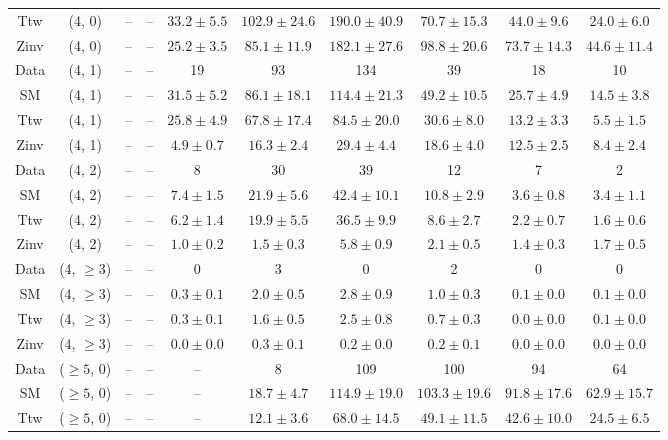 \begin{table}[h!]
{\begin{tabular}{cccccccccc}
	Ttw & (4, 0) & -- & -- & $33.2\pm 5.5$ & $102.9\pm 24.6$ & $190.0\pm 40.9$ & $70.7\pm 15.3$ & $44.0\pm 9.6$ & $24.0\pm 6.0$ \\[0.5ex] 
	Zinv & (4, 0) & -- & -- & $25.2\pm 3.5$ & $85.1\pm 11.9$ & $182.1\pm 27.6$ & $98.8\pm 20.6$ & $73.7\pm 14.3$ & $44.6\pm 11.4$ \\[0.5ex] 
	Data & (4, 1) & -- & -- & 19 & 93 & 134 & 39 & 18 & 10 \\[0.5ex] 
	SM & (4, 1) & -- & -- & $31.5\pm 5.2$ & $86.1\pm 18.1$ & $114.4\pm 21.3$ & $49.2\pm 10.5$ & $25.7\pm 4.9$ & $14.5\pm 3.8$ \\[0.5ex] 
	Ttw & (4, 1) & -- & -- & $25.8\pm 4.9$ & $67.8\pm 17.4$ & $84.5\pm 20.0$ & $30.6\pm 8.0$ & $13.2\pm 3.3$ & $5.5\pm 1.5$ \\[0.5ex] 
	Zinv & (4, 1) & -- & -- & $4.9\pm 0.7$ & $16.3\pm 2.4$ & $29.4\pm 4.4$ & $18.6\pm 4.0$ & $12.5\pm 2.5$ & $8.4\pm 2.4$ \\[0.5ex] 
	Data & (4, 2) & -- & -- & 8 & 30 & 39 & 12 & 7 & 2 \\[0.5ex] 
	SM & (4, 2) & -- & -- & $7.4\pm 1.5$ & $21.9\pm 5.6$ & $42.4\pm 10.1$ & $10.8\pm 2.9$ & $3.6\pm 0.8$ & $3.4\pm 1.1$ \\[0.5ex] 
	Ttw & (4, 2) & -- & -- & $6.2\pm 1.4$ & $19.9\pm 5.5$ & $36.5\pm 9.9$ & $8.6\pm 2.7$ & $2.2\pm 0.7$ & $1.6\pm 0.6$ \\[0.5ex] 
	Zinv & (4, 2) & -- & -- & $1.0\pm 0.2$ & $1.5\pm 0.3$ & $5.8\pm 0.9$ & $2.1\pm 0.5$ & $1.4\pm 0.3$ & $1.7\pm 0.5$ \\[0.5ex] 
	Data & (4, $\ge3$) & -- & -- & 0 & 3 & 0 & 2 & 0 & 0 \\[0.5ex] 
	SM & (4, $\ge3$) & -- & -- & $0.3\pm 0.1$ & $2.0\pm 0.5$ & $2.8\pm 0.9$ & $1.0\pm 0.3$ & $0.1\pm 0.0$ & $0.1\pm 0.0$ \\[0.5ex] 
	Ttw & (4, $\ge3$) & -- & -- & $0.3\pm 0.1$ & $1.6\pm 0.5$ & $2.5\pm 0.8$ & $0.7\pm 0.3$ & $0.0\pm 0.0$ & $0.1\pm 0.0$ \\[0.5ex] 
	Zinv & (4, $\ge3$) & -- & -- & $0.0\pm 0.0$ & $0.3\pm 0.1$ & $0.2\pm 0.0$ & $0.2\pm 0.1$ & $0.0\pm 0.0$ & $0.0\pm 0.0$ \\[0.5ex] 
	Data & ($\ge5$, 0) & -- & -- & -- & 8 & 109 & 100 & 94 & 64 \\[0.5ex] 
	SM & ($\ge5$, 0) & -- & -- & -- & $18.7\pm 4.7$ & $114.9\pm 19.0$ & $103.3\pm 19.6$ & $91.8\pm 17.6$ & $62.9\pm 15.7$ \\[0.5ex] 
	Ttw & ($\ge5$, 0) & -- & -- & -- & $12.1\pm 3.6$ & $68.0\pm 14.5$ & $49.1\pm 11.5$ & $42.6\pm 10.0$ & $24.5\pm 6.5$ \\[0.5ex] 

\end{tabular}}
\end{table}
